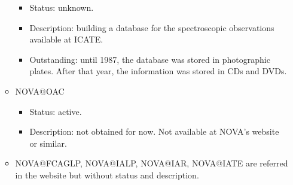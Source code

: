 \documentclass[11pt]{article}
\begin{document}
\begin{itemize}
\begin{itemize}
\begin{itemize}
                                      \item Status: unknown.
                                      \item Description: building a database for
the spectroscopic observations available at ICATE.
                                      \item Outstanding: until 1987, the
database was stored in photographic plates.  After that year, the information
was stored in CDs and DVDs.
                                  \end{itemize}
                              \item NOVA@OAC
                                  \begin{itemize}
                                      \item Status: active.
                                      \item Description: not obtained for now.
Not available at NOVA's website or similar.
                                  \end{itemize}
                              \item NOVA@FCAGLP, NOVA@IALP, NOVA@IAR, NOVA@IATE
are referred in the website but without status and description.
                          \end{itemize}
                 \end{itemize}
\end{document}
